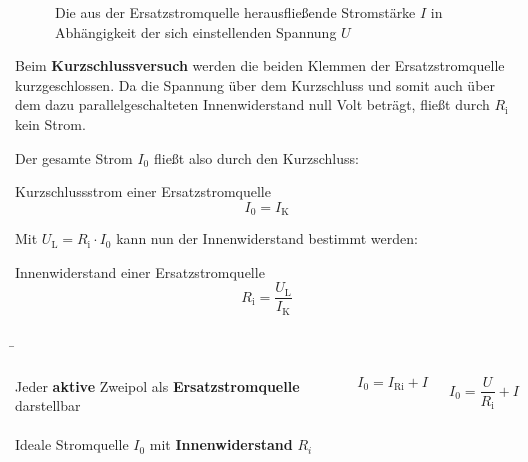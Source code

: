 \begin{frame}
{\begin{figure}[h!]
			\caption{Die aus der Ersatzstromquelle herausfließende Stromstärke $I$ in Abhängigkeit der sich einstellenden Spannung $U$}
			\label{fig:kennliniestrom}
		\end{figure}
		
		
		
		Beim \textbf{Kurzschlussversuch} werden die beiden Klemmen der Ersatzstromquelle kurzgeschlossen. 
		Da die Spannung über dem Kurzschluss und somit
		auch über dem dazu parallelgeschalteten Innenwiderstand null Volt beträgt, fließt durch 
		$R_\mathrm{i}$ kein Strom.
		
		Der gesamte Strom $I_0$ fließt also durch den Kurzschluss:
		
		
		
		\begin{Merksatz}{Kurzschlussstrom einer Ersatzstromquelle}{}
			\begin{equation*}
				I_0 = I_\mathrm{K}
			\end{equation*}
		\end{Merksatz}
		
		
		
		
		Mit $U_\mathrm{L} = R_\mathrm{i} \cdot I_0$ kann nun der Innenwiderstand bestimmt werden:
		
		\begin{Merksatz}{Innenwiderstand einer Ersatzstromquelle}{}
			\begin{equation*}
				R_\mathrm{i} = \frac{U_\mathrm{L}}{I_\mathrm{K}}
			\end{equation*}
		\end{Merksatz}	
		
	}
	\b{
	
		\begin{columns}
			
			
			Jeder \textbf{aktive} Zweipol als \textbf{Ersatzstromquelle} darstellbar\\
			
			\phantom{text}\\
			
			Ideale Stromquelle $I_0$ mit 
			\textbf{Innenwiderstand} $R_i$
			
			\begin{equation*}
				I_0 = I_\mathrm{Ri} + I
			\end{equation*}
			
			\begin{equation*}
				I_0 =\frac{U}{R_\mathrm{i}} + I
			\end{equation*}
			

\end{columns}}
\end{frame}
